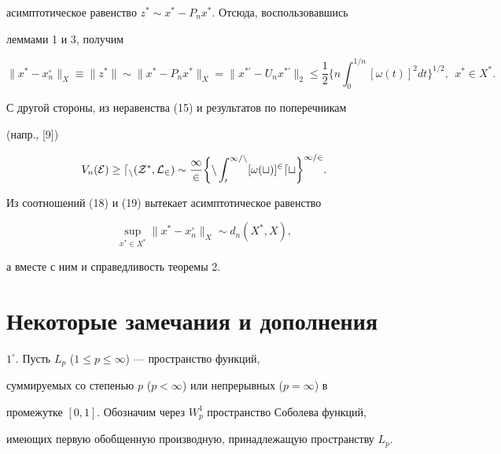 асимптотическое равенство $z^*\sim x^*-P_n x^*$. Отсюда, воспользовавшись 


леммами 1 и 3, получим 


\begin{equation} 


\|x^*-x^\circ_n\|_X\equiv\|z^*\|\sim\|x^*-P_n x^*\|_X= 


\|x^{*\prime}-U_n x^{*\prime}\|_2\le\frac{1}{2}\bigg\{n 


\int^{1/n}_0[\omega(t)]^2dt\bigg\}^{1/2},\ \ x^*\in X^*. 


\end{equation} 


 


С другой стороны, из неравенства (15) и результатов по поперечникам 


(напр., [9]) 


\begin{equation} 


V_n(\cal E)\ge d_n(Z^*,L_2)\sim\frac{1}{2}\bigg\{n 


\int^{1/n}_0[\omega(t)]^2dt\bigg\}^{1/2}. 


\end{equation} 


Из соотношений (18) и (19) вытекает асимптотическое равенство 


$$ 


\sup_{x^*\in X^*}\|x^*-x^\circ_n\|_X\sim d_n(X^*,X), 


$$ 


а вместе с ним и справедливость теоремы 2. 


 


 


 


\section{Некоторые замечания и дополнения} 


 


$1^\circ$. Пусть $L_p$ ($1\le p\le\infty$) --- пространство функций, 


суммируемых со степенью $p$ ($p<\infty$) или непрерывных ($p=\infty$) в 


промежутке $[0,1]$. Обозначим через $W^1_p$ пространство Соболева функций, 


имеющих первую обобщенную производную, принадлежащую пространству $L_p$. 


